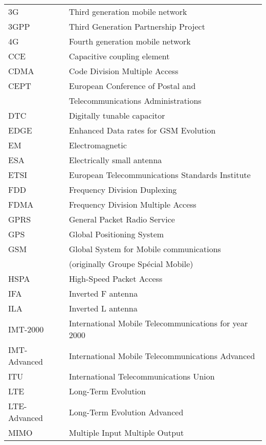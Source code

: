 \begin{tabular}{ll}
3G          & Third generation mobile network \\
3GPP        & Third Generation Partnership Project \\
4G          & Fourth generation mobile network \\
CCE         & Capacitive coupling element\\
CDMA        & Code Division Multiple Access \\
CEPT        & European Conference of Postal and \\
            & Telecommunications Administrations \\
DTC         & Digitally tunable capacitor\\
EDGE        & Enhanced Data rates for GSM Evolution \\
EM          & Electromagnetic\\
ESA         & Electrically small antenna\\
ETSI        & European Telecommunications Standards Institute\\
FDD         & Frequency Division Duplexing \\
FDMA        & Frequency Division Multiple Access \\
GPRS        & General Packet Radio Service \\
GPS         & Global Positioning System \\
GSM         & Global System for Mobile communications \\
            & (originally Groupe Spécial Mobile) \\
HSPA        & High-Speed Packet Access \\
IFA         & Inverted F antenna\\
ILA         & Inverted L antenna\\
IMT-2000    & International Mobile Telecommunications for year 2000 \\
IMT-Advanced & International Mobile Telecommunications Advanced \\
ITU         & International Telecommunications Union \\
LTE         & Long-Term Evolution \\
LTE-Advanced & Long-Term Evolution Advanced\\
MIMO        & Multiple Input Multiple Output \\

\end{tabular}
